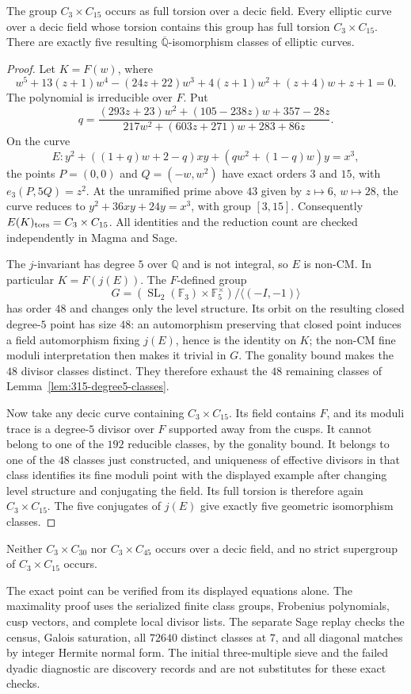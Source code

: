 \begin{proposition}\label{prop:decic315}
The group $C_3\times C_{15}$ occurs as full torsion over a decic field.
Every elliptic curve over a decic field whose torsion contains this
group has full torsion $C_3\times C_{15}$.
There are exactly five resulting $\overline{\mathbb Q}$-isomorphism
classes of elliptic curves.
\end{proposition}
\begin{proof}
Let $K=F(w)$, where
\[
 w^5+13(z+1)w^4-(24z+22)w^3+4(z+1)w^2+(z+4)w+z+1=0.
\]
The polynomial is irreducible over $F$. Put
\[
 q=\frac{(293z+23)w^2+(105-238z)w+357-28z}
         {217w^2+(603z+271)w+283+86z}.
\]
On the curve
\[
 E:y^2+((1+q)w+2-q)xy+(qw^2+(1-q)w)y=x^3,
\]
the points $P=(0,0)$ and $Q=(-w,w^2)$ have exact orders $3$ and $15$,
with $e_3(P,5Q)=z^2$. At the unramified prime above $43$ given by
$z\mapsto6$, $w\mapsto28$, the curve reduces to $y^2+36xy+24y=x^3$, with group
$[3,15]$. Consequently $E(K)_{\rm tors}=C_3\times C_{15}$.
All identities and the reduction count are checked independently
in Magma and Sage.

The $j$-invariant has degree $5$ over $\mathbb Q$ and is not integral,
so $E$ is non-CM. In particular $K=F(j(E))$.
The $F$-defined group
\[
 G=(\operatorname{SL}_2(\mathbb F_3)\times\mathbb F_5^\times)
       /\langle(-I,-1)\rangle
\]
has order $48$ and changes only the level structure.
Its orbit on the resulting closed degree-$5$ point has size $48$:
an automorphism preserving that closed point induces a field
 automorphism fixing $j(E)$, hence is the identity on $K$;
the non-CM fine moduli interpretation then makes it trivial in $G$.
The gonality bound makes the $48$ divisor classes distinct.
They therefore exhaust the $48$ remaining classes of
Lemma~\ref{lem:315-degree5-classes}.

Now take any decic curve containing $C_3\times C_{15}$.
Its field contains $F$, and its moduli trace is a degree-$5$
divisor over $F$ supported away from the cusps. It cannot belong
to one of the $192$ reducible classes, by the gonality bound.
It belongs to one of the $48$ classes just constructed, and
uniqueness of effective divisors in that class identifies its
fine moduli point with the displayed example after changing
level structure and conjugating the field. Its full torsion is
therefore again $C_3\times C_{15}$.
The five conjugates of $j(E)$ give exactly five geometric
isomorphism classes.
\end{proof}

\begin{corollary}\label{cor:decic315-maximal}
Neither $C_3\times C_{30}$ nor $C_3\times C_{45}$ occurs over a decic
field, and no strict supergroup of $C_3\times C_{15}$ occurs.
\end{corollary}

The exact point can be verified from its displayed equations alone.
The maximality proof uses the serialized finite class groups,
Frobenius polynomials, cusp vectors, and complete local divisor lists.
The separate Sage replay checks the census, Galois saturation,
all $72640$ distinct classes at $7$, and all diagonal matches by integer
Hermite normal form. The initial three-multiple sieve and the failed
dyadic diagnostic are discovery records and are not substitutes for
these exact checks.
